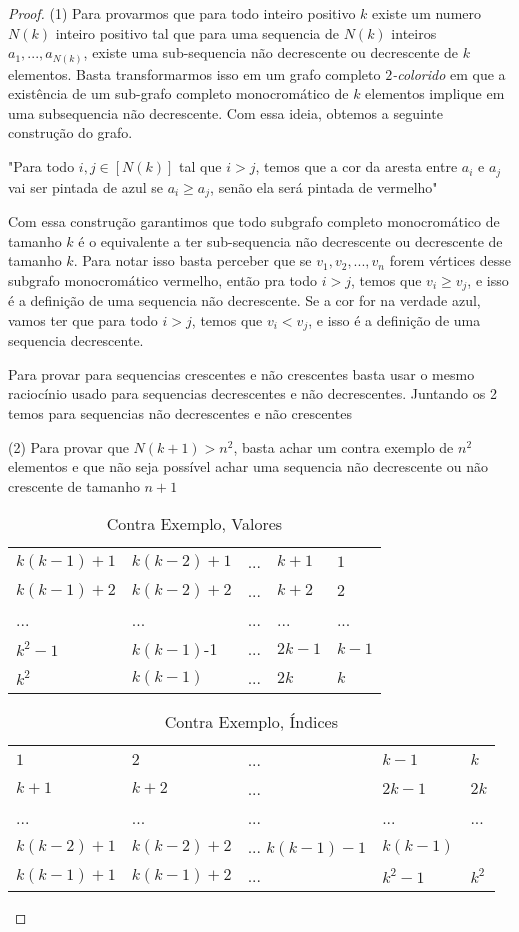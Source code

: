 \documentclass{article}
\begin{document}
\begin{proof}
    (1) Para provarmos que para todo inteiro positivo $k$ existe um numero $N(k)$ inteiro positivo tal que para uma sequencia de $N(k)$ inteiros $a_1, ..., a_{N(k)}$, existe uma sub-sequencia não decrescente ou decrescente de $k$ elementos. Basta transformarmos isso em um grafo completo $2$\emph{-colorido} em que a existência de um sub-grafo completo monocromático de $k$ elementos implique em uma subsequencia não decrescente. Com essa ideia, obtemos a seguinte construção do grafo.

    "Para todo $i,j \in [N(k)]$ tal que $i > j$, temos que a cor da aresta entre $a_i$ e $a_j$ vai ser pintada de azul se $a_i \ge a_j$, senão ela será pintada de vermelho"

    Com essa construção garantimos que todo subgrafo completo monocromático de tamanho $k$ é o equivalente a ter sub-sequencia não decrescente ou decrescente de tamanho $k$. Para notar isso basta perceber que se $v_1, v_2, ..., v_n$ forem vértices desse subgrafo monocromático vermelho, então pra todo $i > j$, temos que $v_i \ge v_j$, e isso é a definição de uma sequencia não decrescente. Se a cor for na verdade azul, vamos ter que para todo $i > j$, temos que $v_i < v_j$, e isso é a definição de uma sequencia decrescente.

    Para provar para sequencias crescentes e não crescentes basta usar o mesmo raciocínio usado para sequencias decrescentes e não decrescentes. Juntando os 2 temos para sequencias não decrescentes e não crescentes

    (2) Para provar que $N(k+1) > n^2$, basta achar um contra exemplo de $n^2$ elementos e que não seja possível achar uma sequencia não decrescente ou não crescente de tamanho $n+1$

    \begin{table}[h]
    \centering
    \caption{Contra Exemplo, Valores}
    \begin{tabular}{lllll}
    $k(k-1)+1$ & $k(k-2)+1$ & ... & $k+1$ & $1$ \\
    $k(k-1)+2$ & $k(k-2)+2$ & ... & $k+2$ & $2$ \\
    ... & ... & ... & ... & ... \\
    $k^2-1$ & $k(k-1)$-1 & ... & $2k-1$ & $k-1$ \\
    $k^2$ & $k(k-1)$ & ... & $2k$ & $k$
    \end{tabular}
    \end{table}

    \begin{table}[h]
    \centering
    \caption{Contra Exemplo, Índices}
    \begin{tabular}{lllll}
    $1$ & $2$ & ... & $k-1$ & $k$ \\
    $k+1$ & $k+2$ & ... & $2k-1$ & $2k$ \\
    ... & ... & ... & ... & ... \\
    $k(k-2)+1$ & $k(k-2)+2$ & ... $k(k-1)-1$ & $k(k-1)$ \\
    $k(k-1)+1$ & $k(k-1)+2$ & ... & $k^2-1$ & $k^2$ \\
    \end{tabular}
    \end{table}


\end{proof}
\end{document}

